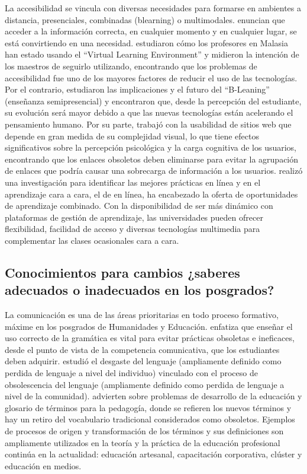 \documentclass{textolivre}
\begin{document}
La accesibilidad se vincula con diversas necesidades para formarse en ambientes a distancia, presenciales, combinadas (blearning) o multimodales. \textcite{guabassi_personalized_2018} enuncian que acceder a la información correcta, en cualquier momento y en cualquier lugar, se está convirtiendo en una necesidad. \textcite{awang_teachers_2018} estudiaron cómo los profesores en Malasia han estado usando el “Virtual Learning Environment” y midieron la intención de los maestros de seguirlo utilizando, encontrando que los problemas de accesibilidad fue uno de los mayores factores de reducir el uso de las tecnologías. Por el contrario, \textcite{dziuban_blended_2018} estudiaron las implicaciones y el futuro del “B-Leaning” (enseñanza semipresencial) y encontraron que, desde la percepción del estudiante, su evolución será mayor debido a que las nuevas tecnologías están acelerando el pensamiento humano. Por su parte, \textcite{chen_improving_2018} trabajó con la usabilidad de sitios web que depende en gran medida de su complejidad visual, lo que tiene efectos significativos sobre la percepción psicológica y la carga cognitiva de los usuarios, encontrando que los enlaces obsoletos deben eliminarse para evitar la agrupación de enlaces que podría causar una sobrecarga de información a los usuarios. \textcite{skiba_horizon_2017} realizó una investigación para identificar las mejores prácticas en línea y en el aprendizaje cara a cara, el de en línea, ha encabezado la oferta de oportunidades de aprendizaje combinado. Con la disponibilidad de ser más dinámico con plataformas de gestión de aprendizaje, las universidades pueden ofrecer flexibilidad, facilidad de acceso y diversas tecnologías multimedia para complementar las clases ocasionales cara a cara.

\subsection{Conocimientos para cambios ¿saberes adecuados o inadecuados en los posgrados?}\label{sec-formato}
La comunicación es una de las áreas prioritarias en todo proceso formativo, máxime en los posgrados de Humanidades y Educación. \textcite{cano_vela_ensenar_2017} enfatiza que enseñar el uso correcto de la gramática es vital para evitar prácticas obsoletas e ineficaces, desde el punto de vista de la competencia comunicativa, que los estudiantes deben adquirir. \textcite{jones_does_2018} estudió el desgaste del lenguaje (ampliamente definido como perdida de lenguaje a nivel del individuo) vinculado con el proceso de obsolescencia del lenguaje (ampliamente definido como perdida de lenguaje a nivel de la comunidad). \textcite{gudilina_transformation_2017} advierten sobre problemas de desarrollo de la educación y glosario de términos para la pedagogía, donde se refieren los nuevos términos y hay un retiro del vocabulario tradicional considerados como obsoletos. Ejemplos de procesos de origen y transformación de los términos y sus definiciones son ampliamente utilizados en la teoría y la práctica de la educación profesional continúa en la actualidad: educación artesanal, capacitación corporativa, clúster y educación en medios.
\end{document}
